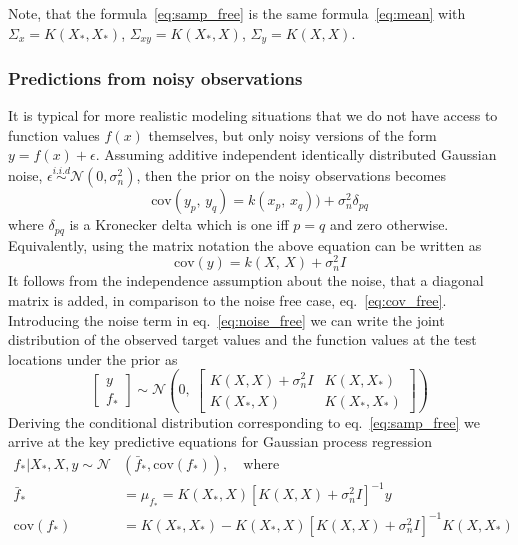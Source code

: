 \documentclass{article}[12pt]
\def\eps{\epsilon}
\newcommand{\cov}{\mathrm{cov}}
\begin{document}
Note, that the formula~\eqref{eq:samp_free} is the same formula~\eqref{eq:mean} with $\Sigma_x=K(X_*,X_*)$, $\Sigma_{xy} = K(X_*,X)$, $\Sigma_y=K(X,X)$.


\subsubsection{Predictions from noisy observations}
It is typical for more realistic modeling situations that we do not have access to function values $f(x)$ themselves, but only noisy versions of the form $y=f(x)+\eps$. Assuming additive independent identically distributed Gaussian noise, $\eps\overset{i.i.d}{\sim}\mathcal{N}(0,\sigma_n^2)$, then the prior on the noisy observations becomes
\begin{equation}
\cov(y_p,\,y_q)= k(x_p,\, x_q))+\sigma_n^2 \delta_{pq}
\end{equation}
where $\delta_{pq}$ is a Kronecker delta which is one iff $p=q$ and zero otherwise. Equivalently, using the matrix notation the above equation can be written as
\begin{equation}
\cov(y)= k(X,\, X)+\sigma_n^2 I
\end{equation}
It follows from the independence assumption about the noise, that a diagonal matrix is added, in comparison to the noise free case, eq.~\eqref{eq:cov_free}.
Introducing the noise term in eq.~\eqref{eq:noise_free} we can write the joint distribution of the observed target values and the function values at the test locations under the prior as
\begin{equation}
\begin{bmatrix}
y\\ f_*
\end{bmatrix} \sim
\mathcal{N}\left(0,\ 
\begin{bmatrix}
K(X,X)+\sigma_n^2 I & K(X,X_*)\\
K(X_*,X) & K(X_*,X_*)
\end{bmatrix}\right)
\end{equation}
Deriving the conditional distribution corresponding to eq.~\eqref{eq:samp_free} we arrive at
the key predictive equations for Gaussian process regression
\begin{equation}
\label{eq:samp_noise}
\begin{aligned}
f_*| X_*,X,y \sim \mathcal{N}&\left(\bar{f}_*, \cov(f_*)\right),\quad\text{where} \\
\bar{f}_* &=\mu_{f_*} = K(X_*,X)\left[K(X,X)+\sigma_n^2 I\right]^{-1} y\\
\cov(f_*) &= K(X_*,X_*)-K(X_*,X)\left[K(X,X)+\sigma_n^2 I\right]^{-1} K(X,X_*)
\end{aligned}
\end{equation}
\end{document}
